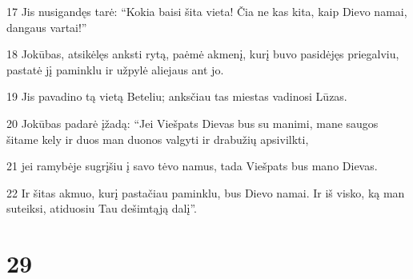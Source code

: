 \par 17 Jis nusigandęs tarė: “Kokia baisi šita vieta! Čia ne kas kita, kaip Dievo namai, dangaus vartai!” 
\par 18 Jokūbas, atsikėlęs anksti rytą, paėmė akmenį, kurį buvo pasidėjęs priegalviu, pastatė jį paminklu ir užpylė aliejaus ant jo. 
\par 19 Jis pavadino tą vietą Beteliu; anksčiau tas miestas vadinosi Lūzas. 
\par 20 Jokūbas padarė įžadą: “Jei Viešpats Dievas bus su manimi, mane saugos šitame kely ir duos man duonos valgyti ir drabužių apsivilkti, 
\par 21 jei ramybėje sugrįšiu į savo tėvo namus, tada Viešpats bus mano Dievas. 
\par 22 Ir šitas akmuo, kurį pastačiau paminklu, bus Dievo namai. Ir iš visko, ką man suteiksi, atiduosiu Tau dešimtąją dalį”.



\chapter{29}


